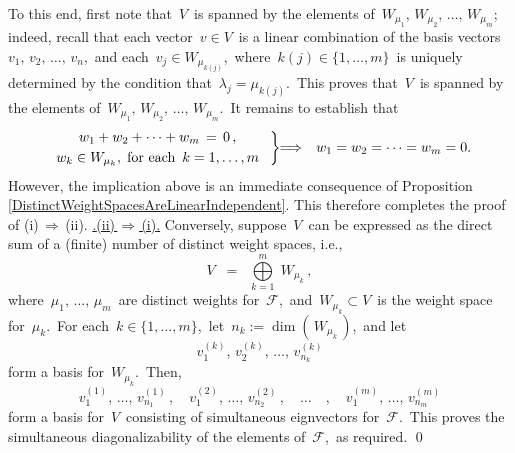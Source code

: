 To this end, first note that \,$V$\, is spanned by the elements of
\,$W_{\mu_{1}},\, W_{\mu_{2}},\, \ldots,\, W_{\mu_{m}}$;\,
indeed, recall that each vector \,$v \in V$\, is a linear combination of the basis vectors
\,$v_{1},\, v_{2},\, \ldots,\, v_{n}$,\,
and each \,$v_{j} \in W_{\mu_{k(j)}}$,\, where \,$k(j) \in \{1,\ldots,m\}$\,
is uniquely determined by the condition that \,$\lambda_{j} = \mu_{k(j)}$.\,
This proves that \,$V$\, is spanned by the elements of
\,$W_{\mu_{1}},\, W_{\mu_{2}},\, \ldots,\, W_{\mu_{m}}$.\,
It remains to establish that
\begin{equation*}
\left.\begin{array}{c}
w_{1} + w_{2} + \cdots + w_{m} \,=\, 0\,,
\\
\overset{{\color{white}.}}{
    w_{k} \in W_{\mu_{k}}, \;\textnormal{for each \,$k = 1,\ldots,m$}
    }
\end{array}\;\right\}
\!\!\Longrightarrow\;\;
\,w_{1} = w_{2} = \cdots = w_{m} = 0.
\end{equation*}
However, the implication above is an immediate consequence of
Proposition \ref{DistinctWeightSpacesAreLinearIndependent}.
This therefore completes the proof of (i)\,$\Longrightarrow$\,(ii).
\vskip 0.3cm
\noindent
\underline{{\color{white}.}(ii)\,$\Longrightarrow$\,(i){\color{white}.}}
\vskip 0.2cm
\noindent
Conversely, suppose \,$V$\, can be expressed
as the direct sum of a (finite) number of distinct weight spaces, i.e.,
\begin{equation*}
V \;\; = \;\; \overset{m}{\underset{k=1}{\bigoplus}}\;W_{\mu_{k}}\,,
\end{equation*}
where
\,$\mu_{1},\, \ldots,\, \mu_{m}$\, are distinct weights for \,$\mathcal{F}$,\,
and \,$W_{\mu_{k}} \subset V$\, is the weight space for \,$\mu_{k}$.\,
For each \,$k \in \{1,\ldots,m\}$,\,
let \,$n_{k} := \dim\!\left(\,W_{\mu_{k}}\,\right)$,\,
and let
\begin{equation*}
v^{(k)}_{1},\, v^{(k)}_{2},\, \ldots,\,  v^{(k)}_{n_{k}} 
\end{equation*}
form a basis for \,$W_{\mu_{k}}$.\,
Then,
\begin{equation*}
v^{(1)}_{1},\, \ldots,\,  v^{(1)}_{n_{1}}\,,
\quad
v^{(2)}_{1},\, \ldots,\,  v^{(2)}_{n_{2}}\,,
\quad
\ldots\quad,
\quad
v^{(m)}_{1},\, \ldots,\,  v^{(m)}_{n_{m}} 
\end{equation*}
form a basis for \,$V$\, consisting of simultaneous eignvectors for \,$\mathcal{F}$.\,
This proves the simultaneous diagonalizability of the elements of \,$\mathcal{F}$,\, as required.
\qed

